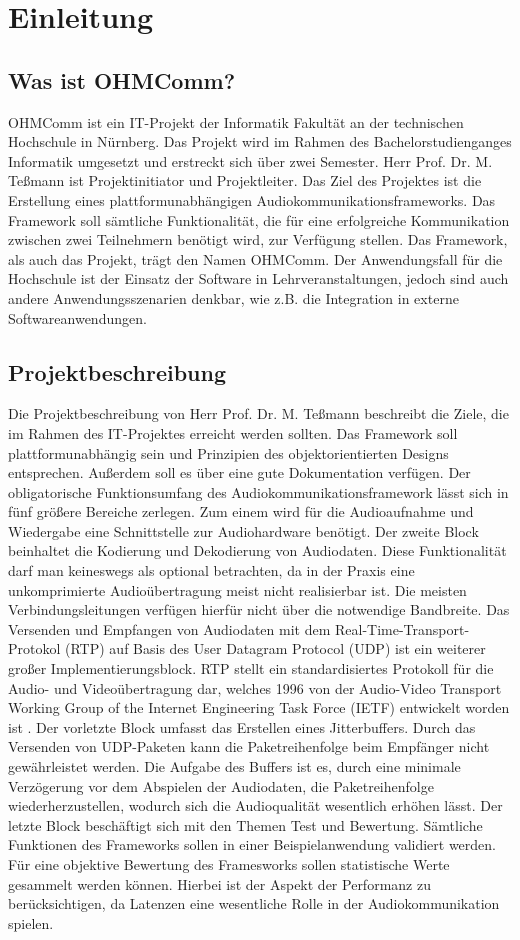 \chapter{Einleitung}
\section{Was ist OHMComm?}
OHMComm ist ein IT-Projekt der Informatik Fakultät an der technischen Hochschule in Nürnberg. Das Projekt wird im Rahmen des Bachelorstudienganges Informatik umgesetzt und erstreckt sich über zwei Semester. Herr Prof. Dr. M. Teßmann ist Projektinitiator und Projektleiter. Das Ziel des Projektes ist die Erstellung eines plattformunabhängigen Audiokommunikationsframeworks. Das Framework soll sämtliche Funktionalität, die für eine erfolgreiche Kommunikation zwischen zwei Teilnehmern benötigt wird, zur Verfügung stellen. Das Framework, als auch das Projekt, trägt den Namen OHMComm. Der Anwendungsfall für die Hochschule ist der Einsatz der Software in Lehrveranstaltungen, jedoch sind auch andere Anwendungsszenarien denkbar, wie z.B. die Integration in externe Softwareanwendungen.

\section{Projektbeschreibung}
Die Projektbeschreibung von Herr Prof. Dr. M. Teßmann beschreibt die Ziele, die im Rahmen des IT-Projektes erreicht werden sollten. Das Framework soll plattformunabhängig sein und Prinzipien des objektorientierten Designs entsprechen. Außerdem soll es über eine gute Dokumentation verfügen.
Der obligatorische Funktionsumfang des Audiokommunikationsframework lässt sich in fünf größere Bereiche zerlegen. 
Zum einem wird für die Audioaufnahme und Wiedergabe eine Schnittstelle zur Audiohardware benötigt. 
Der zweite Block beinhaltet die Kodierung und Dekodierung von Audiodaten. Diese Funktionalität darf man keineswegs als optional betrachten, da in der Praxis eine unkomprimierte Audioübertragung meist nicht realisierbar ist. Die meisten Verbindungsleitungen verfügen hierfür nicht über die notwendige Bandbreite. 
Das Versenden und Empfangen von Audiodaten mit dem Real-Time-Transport-Protokol (RTP) auf Basis des User Datagram Protocol (UDP) ist ein weiterer großer Implementierungsblock. RTP stellt ein standardisiertes Protokoll für die Audio- und Videoübertragung dar, welches 1996 von der Audio-Video Transport Working Group of the Internet Engineering Task Force (IETF) entwickelt worden ist \cite{RFC3550}. 
Der vorletzte Block umfasst das Erstellen eines Jitterbuffers. Durch das Versenden von UDP-Paketen kann die Paketreihenfolge beim Empfänger nicht gewährleistet werden. Die Aufgabe des Buffers ist es, durch eine minimale Verzögerung vor dem Abspielen der Audiodaten, die Paketreihenfolge wiederherzustellen, wodurch sich die Audioqualität wesentlich erhöhen lässt.
Der letzte Block beschäftigt sich mit den Themen Test und Bewertung. Sämtliche Funktionen des Frameworks sollen in einer Beispielanwendung validiert werden. Für eine objektive Bewertung des Framesworks sollen statistische Werte gesammelt werden können. Hierbei ist der Aspekt der Performanz zu berücksichtigen, da Latenzen eine wesentliche Rolle in der Audiokommunikation spielen.
	
